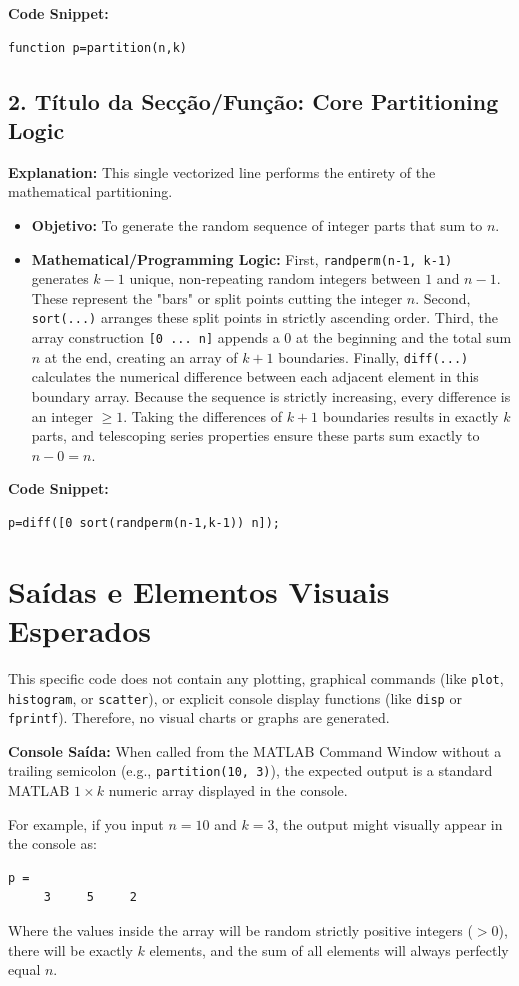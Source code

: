 \textbf{Code Snippet:}
\begin{lstlisting}
function p=partition(n,k)
\end{lstlisting}

\subsection{2. Título da Secção/Função: Core Partitioning Logic}
\textbf{Explanation:} 
This single vectorized line performs the entirety of the mathematical partitioning.
\begin{itemize}
    \item \textbf{Objetivo:} To generate the random sequence of integer parts that sum to $n$.
    \item \textbf{Mathematical/Programming Logic:} 
    First, \texttt{randperm(n-1, k-1)} generates $k-1$ unique, non-repeating random integers between $1$ and $n-1$. These represent the "bars" or split points cutting the integer $n$.
    Second, \texttt{sort(...)} arranges these split points in strictly ascending order.
    Third, the array construction \texttt{[0 ... n]} appends a $0$ at the beginning and the total sum $n$ at the end, creating an array of $k+1$ boundaries.
    Finally, \texttt{diff(...)} calculates the numerical difference between each adjacent element in this boundary array. Because the sequence is strictly increasing, every difference is an integer $\ge 1$. Taking the differences of $k+1$ boundaries results in exactly $k$ parts, and telescoping series properties ensure these parts sum exactly to $n - 0 = n$.
\end{itemize}

\textbf{Code Snippet:}
\begin{lstlisting}
p=diff([0 sort(randperm(n-1,k-1)) n]);
\end{lstlisting}

\section{Saídas e Elementos Visuais Esperados}

This specific code does not contain any plotting, graphical commands (like \texttt{plot}, \texttt{histogram}, or \texttt{scatter}), or explicit console display functions (like \texttt{disp} or \texttt{fprintf}). Therefore, no visual charts or graphs are generated.

\textbf{Console Saída:}
When called from the MATLAB Command Window without a trailing semicolon (e.g., \texttt{partition(10, 3)}), the expected output is a standard MATLAB $1 \times k$ numeric array displayed in the console. 

For example, if you input $n=10$ and $k=3$, the output might visually appear in the console as:
\begin{verbatim}
p =
     3     5     2
\end{verbatim}

Where the values inside the array will be random strictly positive integers ($>0$), there will be exactly $k$ elements, and the sum of all elements will always perfectly equal $n$.